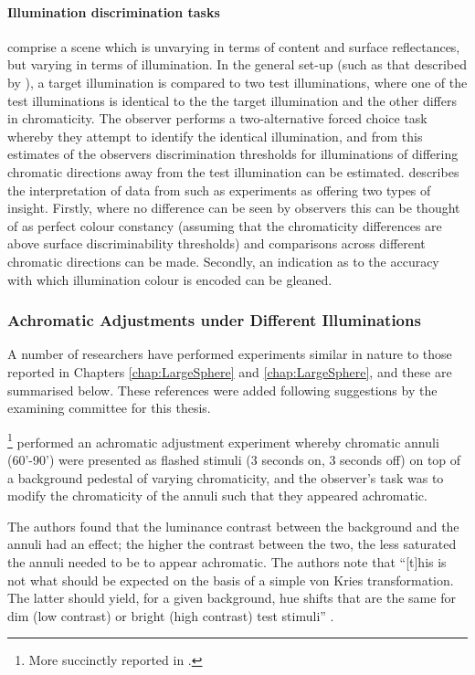 \paragraph{Illumination discrimination tasks} comprise a scene which is unvarying in terms of content and surface reflectances, but varying in terms of illumination. In the general set-up (such as that described by \citet{pearce_chromatic_2014}), a target illumination is compared to two test illuminations, where one of the test illuminations is identical to the the target illumination and the other differs in chromaticity. The observer performs a two-alternative forced choice task whereby they attempt to identify the identical illumination, and from this estimates of the observers discrimination thresholds for illuminations of differing chromatic directions away from the test illumination can be estimated. \citet{aston_illumination_2019} describes the interpretation of data from such as experiments as offering two types of insight. Firstly, where no difference can be seen by observers this can be thought of as perfect colour constancy (assuming that the chromaticity differences are above surface discriminability thresholds) and comparisons across different chromatic directions can be made. Secondly, an indication as to the accuracy with which illumination colour is encoded can be gleaned.

\subsubsection{Achromatic Adjustments under Different Illuminations}

A number of researchers have performed experiments similar in nature to those reported in Chapters \ref{chap:LargeSphere} and \ref{chap:LargeSphere}, and these are summarised below. These references were added following suggestions by the examining committee for this thesis.

\textbf{\citet{werner_effect_1982}}\footnote{More succinctly reported in \citet{walraven_chromatic_1982}.} performed an achromatic adjustment experiment whereby chromatic annuli (60'-90') were presented as flashed stimuli (3 seconds on, 3 seconds off) on top of a background pedestal of varying chromaticity, and the observer's task was to modify the chromaticity of the annuli such that they appeared achromatic. 

The authors found that the luminance contrast between the background and the annuli had an effect; the higher the contrast between the two, the less saturated the annuli needed to be to appear achromatic. The authors note that ``[t]his is not what should be expected on the basis of a simple von Kries transformation. The latter should yield, for a given background, hue shifts that are the same for dim (low contrast) or bright (high contrast) test stimuli'' \citep{walraven_chromatic_1982}.

